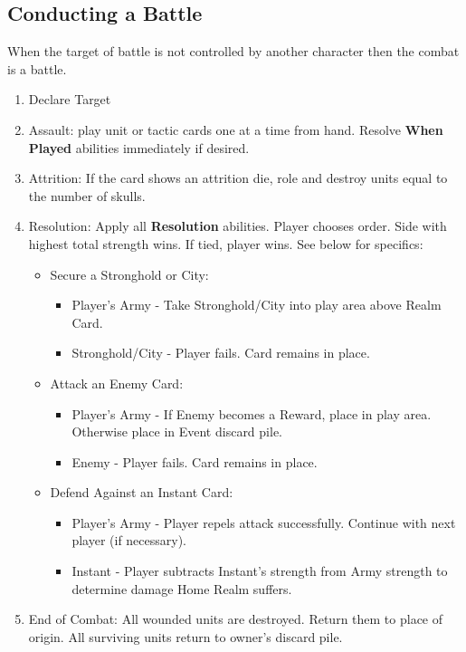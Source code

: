 \documentclass[12pt]{article}
\newenvironment{enumerateCustom}
{\begin{enumerate}
  \setlength{\itemsep}{1pt}
  \setlength{\parskip}{0pt}
  \setlength{\parsep}{0pt}}
{\end{enumerate}}
\newenvironment{itemizeCustom}
{\begin{itemize}
  \setlength{\itemsep}{1pt}
  \setlength{\parskip}{0pt}
  \setlength{\parsep}{0pt}}
{\end{itemize}}
\begin{document}
\begin{multicols*}{2}
\section*{Conducting a Battle}
When the target of battle is not controlled by another character then the combat is a battle.
\begin{enumerateCustom}
    \item Declare Target
    \item Assault: play unit or tactic cards one at a time from hand. Resolve \textbf{When Played} abilities immediately if desired.
    \item Attrition: If the card shows an attrition die, role and destroy units equal to the number of skulls.
    \item Resolution: Apply all \textbf{Resolution} abilities. Player chooses order. Side with highest total strength wins. If tied, player wins. See below for specifics:
        \begin{itemizeCustom}
            \item Secure a Stronghold or City:
                \begin{itemizeCustom}
                    \item Player's Army - Take Stronghold/City into play area above Realm Card.
                    \item Stronghold/City - Player fails. Card remains in place.
                \end{itemizeCustom}
            \item Attack an Enemy Card:
                \begin{itemizeCustom}
                    \item Player's Army - If Enemy becomes a Reward, place in play area. Otherwise place in Event discard pile.
                    \item Enemy - Player fails. Card remains in place.
                \end{itemizeCustom}
            \item Defend Against an Instant Card:
                \begin{itemizeCustom}
                    \item Player's Army - Player repels attack successfully. Continue with next player (if necessary).
                    \item Instant - Player subtracts Instant's strength from Army strength to determine damage Home Realm suffers.
                \end{itemizeCustom}
        \end{itemizeCustom}
    \item End of Combat: All wounded units are destroyed. Return them to place of origin. All surviving units return to owner's discard pile.
\end{enumerateCustom}


\end{multicols*}
\end{document}
